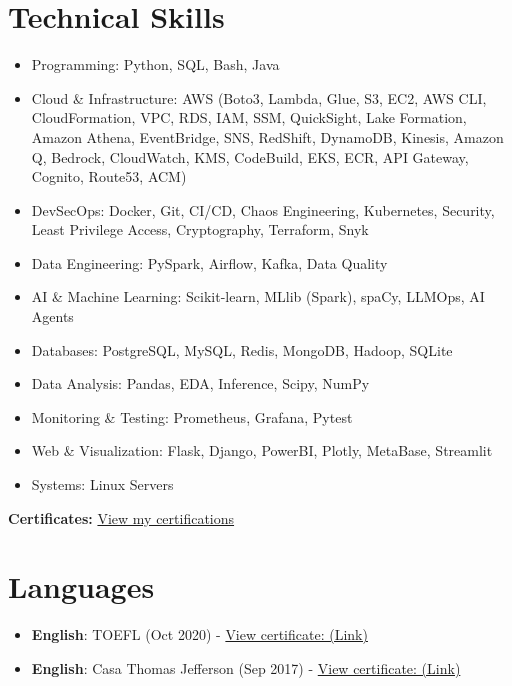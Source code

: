 \documentclass[letterpaper,11pt]{article}%
\newcommand{\resumeItemListStart}{\begin{itemize}[itemsep=0pt, parsep=0pt]}%
\newcommand{\resumeItemListEnd}{\end{itemize}\vspace{-1pt}}%
\begin{document}
%
\section*{Technical Skills}%
\label{sec:TechnicalSkills}%
\begin{multicols}{2}%
\resumeItemListStart%
\item Programming: Python, SQL, Bash, Java%
\item Cloud \& Infrastructure: AWS (Boto3, Lambda, Glue, S3, EC2, AWS CLI, CloudFormation, VPC, RDS, IAM, SSM, QuickSight, Lake Formation, Amazon Athena, EventBridge, SNS, RedShift, DynamoDB, Kinesis, Amazon Q, Bedrock, CloudWatch, KMS, CodeBuild, EKS, ECR, API Gateway, Cognito, Route53, ACM)%
\item DevSecOps: Docker, Git, CI/CD, Chaos Engineering, Kubernetes, Security, Least Privilege Access, Cryptography, Terraform, Snyk%
\item Data Engineering: PySpark, Airflow, Kafka, Data Quality%
\item AI \& Machine Learning: Scikit-learn, MLlib (Spark), spaCy, LLMOps, AI Agents%
\item Databases: PostgreSQL, MySQL, Redis, MongoDB, Hadoop, SQLite%
\item Data Analysis: Pandas, EDA, Inference, Scipy, NumPy%
\item Monitoring \& Testing: Prometheus, Grafana, Pytest%
\item Web \& Visualization: Flask, Django, PowerBI, Plotly, MetaBase, Streamlit%
\item Systems: Linux Servers%
\resumeItemListEnd%
\end{multicols}%
\vspace{0.5em}

%
\textbf{Certificates:} \href{https://robertomdiniz.s3.amazonaws.com/accomplishments.html}{View my certifications}%
\section*{Languages}%
\label{sec:Languages}%
\begin{itemize}[leftmargin=0.15in, label={}]%
\item%
\textbf{English}: TOEFL (Oct 2020) - \href{http://robertomdiniz.s3-website-us-east-1.amazonaws.com/accomplishments/english_TOEFL_my_score.pdf}{View certificate: (Link)}%
\item%
\textbf{English}: Casa Thomas Jefferson (Sep 2017) - \href{http://robertomdiniz.s3-website-us-east-1.amazonaws.com/accomplishments/english_Casa%20Thomas%20Jefferson.pdf}{View certificate: (Link)}%
\end{itemize}

%
\end{document}
